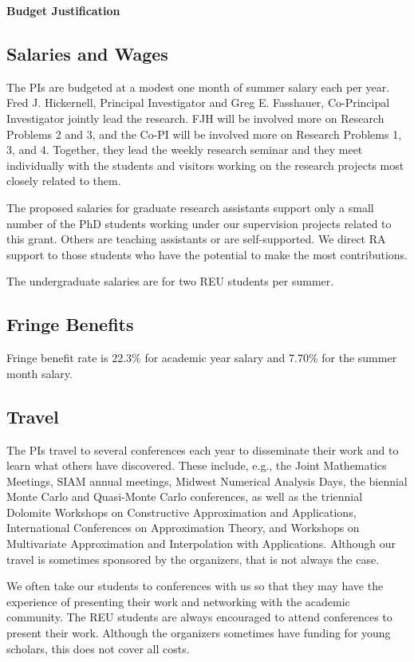 \documentclass[11pt]{NSFamsart}
\begin{document}

\centerline{\textbf{\Large Budget Justification}}

\subsection*{Salaries and Wages}

The PIs are budgeted at a modest one month of summer salary each per year.  Fred J. Hickernell, Principal Investigator and Greg E. Fasshauer, Co-Principal Investigator jointly lead the research.  FJH will be involved more on Research Problems 2 and 3, and the Co-PI will be involved more on Research Problems 1, 3, and 4.  Together, they lead the weekly research seminar and they meet individually with the students and visitors working on the research projects most closely related to them.

The proposed salaries for graduate research assistants support only a small number of the PhD students working under our supervision projects related to this grant.  Others are teaching assistants or are self-supported.  We direct RA support to those students who have the potential to make the most contributions.

The undergraduate salaries are for two REU students per summer.

\subsection*{Fringe Benefits}
Fringe benefit rate is 22.3\% for academic year salary and 7.70\% for the summer month
salary.

\subsection*{Travel}
The PIs travel to several conferences each year to disseminate their work and to learn what others have discovered.  These include, e.g., the Joint Mathematics Meetings, SIAM annual meetings, Midwest Numerical Analysis Days, the biennial Monte Carlo and Quasi-Monte Carlo conferences, as well as the triennial Dolomite Workshops on Constructive Approximation and Applications, International Conferences on Approximation Theory, and Workshops on Multivariate Approximation and Interpolation with Applications. Although our travel is sometimes sponsored by the organizers, that is not always the case.

We often take our students to conferences with us so that they may have the experience of presenting their work and networking with the academic community.  The REU students are always encouraged to attend conferences to present their work.  Although the organizers sometimes have funding for young scholars, this does not cover all costs.
 
\end{document}
